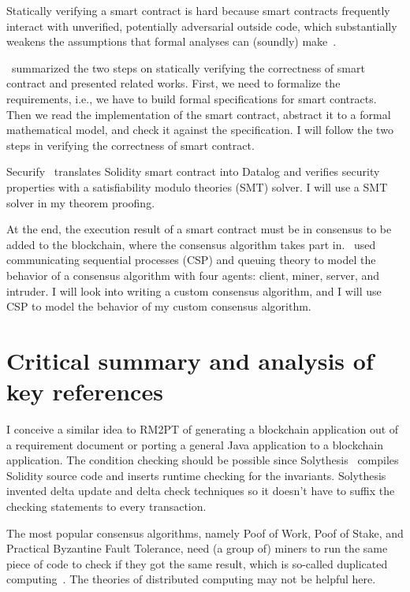 Statically verifying a smart contract is hard because
smart contracts frequently interact with unverified, potentially adversarial outside code, which substantially weakens the assumptions that formal analyses can (soundly) make~\cite{bram2021rich}.

\cite{tolmach2021survey}~summarized the two steps on statically verifying the correctness of smart contract and presented related works.
First, we need to formalize the requirements, i.e., we have to build formal specifications for smart contracts.
Then we read the implementation of the smart contract, abstract it to a formal mathematical model, and check it against the specification.
I will follow the two steps in verifying the correctness of smart contract.

Securify~\cite{tsankov2018securify} translates Solidity smart contract into Datalog and verifies security properties with a satisfiability modulo theories (SMT) solver.
I will use a SMT solver in my theorem proofing.



At the end, the execution result of a smart contract must be in consensus to be added to the blockchain, where the consensus algorithm takes part in.
\cite{altarawneh2021availability}~used communicating sequential processes (CSP) and queuing theory to model the behavior of a consensus algorithm with four agents: client, miner, server, and intruder.
I will look into writing a custom consensus algorithm, and I will use CSP to model the behavior of my custom consensus algorithm.





\section{Critical summary and analysis of key references}


I conceive a similar idea to RM2PT of generating a blockchain application out of a requirement document or porting a general Java application to a blockchain application. The condition checking should be possible since Solythesis~\cite{li2020securing} compiles Solidity source code and inserts runtime checking for the invariants. Solythesis invented delta update and delta check techniques so it doesn't have to suffix the checking statements to every transaction.

The most popular consensus algorithms, namely Poof of Work, Poof of Stake, and Practical Byzantine Fault Tolerance, need (a group of) miners to run the same piece of code to check if they got the same result, which is so-called duplicated computing~\cite{shae2018transform}. The theories of distributed computing may not be helpful here.


